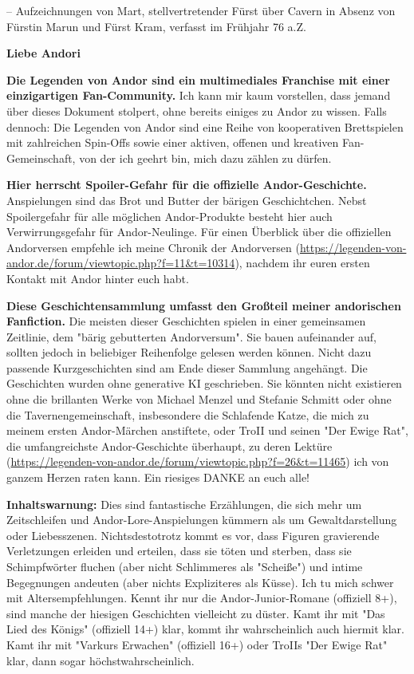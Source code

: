 – Aufzeichnungen von Mart, stellvertretender Fürst über Cavern in Absenz von Fürstin Marun und Fürst Kram, verfasst im Frühjahr 76 a.Z.

\nurvollversion{\vspace*{\fill}}
\newpage
\thispagestyle{plain}

\textbf{Liebe Andori} 
\bigskip

\textbf{Die Legenden von Andor sind ein multimediales Franchise mit einer einzigartigen Fan-Community.} 
Ich kann mir kaum vorstellen, dass jemand über dieses Dokument stolpert, ohne bereits einiges zu Andor zu wissen. Falls dennoch: Die Legenden von Andor sind eine Reihe von kooperativen Brettspielen mit zahlreichen Spin-Offs sowie einer aktiven, offenen und kreativen Fan-Gemeinschaft, von der ich geehrt bin, mich dazu zählen zu dürfen.
\bigskip

\textbf{Hier herrscht Spoiler-Gefahr für die offizielle Andor-Geschichte.} 
Anspielungen sind das Brot und Butter der bärigen Geschichtchen. Nebst Spoilergefahr für alle möglichen Andor-Produkte besteht hier auch Verwirrungsgefahr für Andor-Neulinge. Für einen Überblick über die offiziellen Andorversen empfehle ich meine Chronik der Andorversen (\url{https://legenden-von-andor.de/forum/viewtopic.php?f=11&t=10314}), nachdem ihr euren ersten Kontakt mit Andor hinter euch habt.
\bigskip

\textbf{Diese Geschichtensammlung umfasst den Großteil meiner andorischen Fanfiction.} 
Die meisten dieser Geschichten spielen in einer gemeinsamen Zeitlinie, dem "bärig gebutterten Andorversum". Sie bauen aufeinander auf, sollten jedoch in beliebiger Reihenfolge gelesen werden können. Nicht dazu passende Kurzgeschichten sind am Ende dieser Sammlung angehängt.
Die Geschichten wurden ohne generative KI geschrieben. 
Sie könnten nicht existieren ohne die brillanten Werke von Michael Menzel und Stefanie Schmitt oder ohne die Tavernengemeinschaft, insbesondere die Schlafende Katze, die mich zu meinem ersten Andor-Märchen anstiftete, oder TroII und seinen "Der Ewige Rat", die umfangreichste Andor-Geschichte überhaupt, zu deren Lektüre (\url{https://legenden-von-andor.de/forum/viewtopic.php?f=26&t=11465}) ich von ganzem Herzen raten kann. Ein riesiges DANKE an euch alle!
\bigskip

\textbf{Inhaltswarnung:} 
Dies sind fantastische Erzählungen, die sich mehr um Zeitschleifen und Andor-Lore-Anspielungen kümmern als um Gewaltdarstellung oder Liebesszenen. Nichtsdestotrotz kommt es vor, dass Figuren gravierende Verletzungen erleiden und erteilen, dass sie töten und sterben, dass sie Schimpfwörter fluchen (aber nicht Schlimmeres als "Scheiße") und intime Begegnungen andeuten (aber nichts Expliziteres als Küsse). Ich tu mich schwer mit Altersempfehlungen. Kennt ihr nur die Andor-Junior-Romane (offiziell 8+), sind manche der hiesigen Geschichten vielleicht zu düster. Kamt ihr mit "Das Lied des Königs" (offiziell 14+) klar, kommt ihr wahrscheinlich auch hiermit klar. Kamt ihr mit "Varkurs Erwachen" (offiziell 16+) oder TroIIs "Der Ewige Rat" klar, dann sogar höchstwahrscheinlich.
\bigskip

